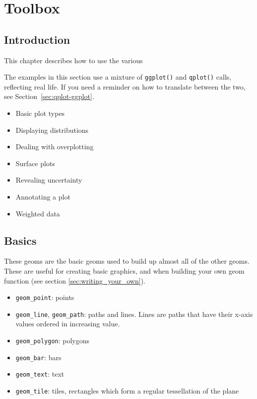 

\chapter{Toolbox}
\label{cha:toolbox}

\section{Introduction}\label{sec:introduction}

This chapter describes how to use the various 

The examples in this section use a mixture of {\tt ggplot()} and {\tt qplot()} calls, reflecting real life.  If you need a reminder on how to translate between the two, see Section~\ref{sec:qplot-ggplot}.

\begin{itemize}
  \item Basic plot types
  \item Displaying distributions
  \item Dealing with overplotting
  \item Surface plots
  \item Revealing uncertainty
  \item Annotating a plot
  \item Weighted data
\end{itemize}

\section{Basics}\label{sub:basics}

These geoms are the basic geoms used to build up almost all of the other geoms.  These are useful for creating basic graphics, and when building your own geom function (see section \ref{sec:writing_your_own}).

\begin{itemize}
  \item {\tt geom\_point}: points
  \item {\tt geom\_line}, {\tt geom\_path}: paths and lines.  Lines are paths that have their x-axis values ordered in increasing value.
  \item {\tt geom\_polygon}: polygons
  \item {\tt geom\_bar}: bars
  \item {\tt geom\_text}: text
  \item {\tt geom\_tile}: tiles, rectangles which form a regular tessellation of the plane
\end{itemize}

